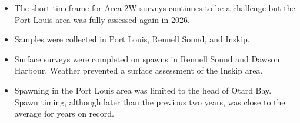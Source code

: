 \begin{itemize}

\item The short timeframe for Area 2W surveys continues to be a
challenge but the Port Louis area was fully assessed again in
2026.

\item Samples were collected in Port Louis, Rennell Sound, and Inskip.

\item Surface surveys were completed on spawns in Rennell Sound and Dawson Harbour.
Weather prevented a surface assessment of the Inskip area.

\item Spawning in the Port Louis area was limited to the head of Otard Bay.
Spawn timing, although later than the previous two years,
was close to the average for years on record.

\end{itemize}